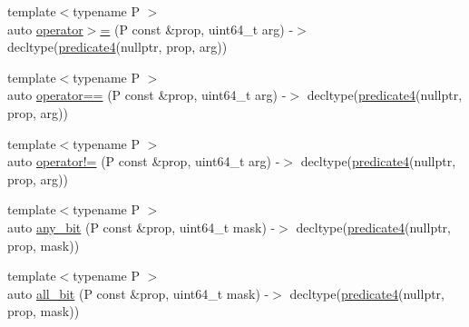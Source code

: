 \begin{DoxyCompactItemize}
{\footnotesize template$<$typename P $>$ }\\auto \hyperlink{namespacepfq__lang_ac37c4aac9486ceca12814ccd9b4c3306}{operator$>$=} (P const \&prop, uint64\-\_\-t arg) -\/$>$ decltype(\hyperlink{namespacepfq__lang_a1a9064340f4197e3dd4109a849a224dc}{predicate4}(nullptr, prop, arg))
\item 
{\footnotesize template$<$typename P $>$ }\\auto \hyperlink{namespacepfq__lang_ac55d12423490f127fcb57b29535ca791}{operator==} (P const \&prop, uint64\-\_\-t arg) -\/$>$ decltype(\hyperlink{namespacepfq__lang_a1a9064340f4197e3dd4109a849a224dc}{predicate4}(nullptr, prop, arg))
\item 
{\footnotesize template$<$typename P $>$ }\\auto \hyperlink{namespacepfq__lang_a982f7b6137536d7e75fe9b2c13d581d4}{operator!=} (P const \&prop, uint64\-\_\-t arg) -\/$>$ decltype(\hyperlink{namespacepfq__lang_a1a9064340f4197e3dd4109a849a224dc}{predicate4}(nullptr, prop, arg))
\item 
{\footnotesize template$<$typename P $>$ }\\auto \hyperlink{namespacepfq__lang_a9e93958b1fecbd660154947b474ffd05}{any\-\_\-bit} (P const \&prop, uint64\-\_\-t mask) -\/$>$ decltype(\hyperlink{namespacepfq__lang_a1a9064340f4197e3dd4109a849a224dc}{predicate4}(nullptr, prop, mask))
\item 
{\footnotesize template$<$typename P $>$ }\\auto \hyperlink{namespacepfq__lang_a424b5bd6563ed52fd84807def8ba2f5f}{all\-\_\-bit} (P const \&prop, uint64\-\_\-t mask) -\/$>$ decltype(\hyperlink{namespacepfq__lang_a1a9064340f4197e3dd4109a849a224dc}{predicate4}(nullptr, prop, mask))
\end{DoxyCompactItemize}


